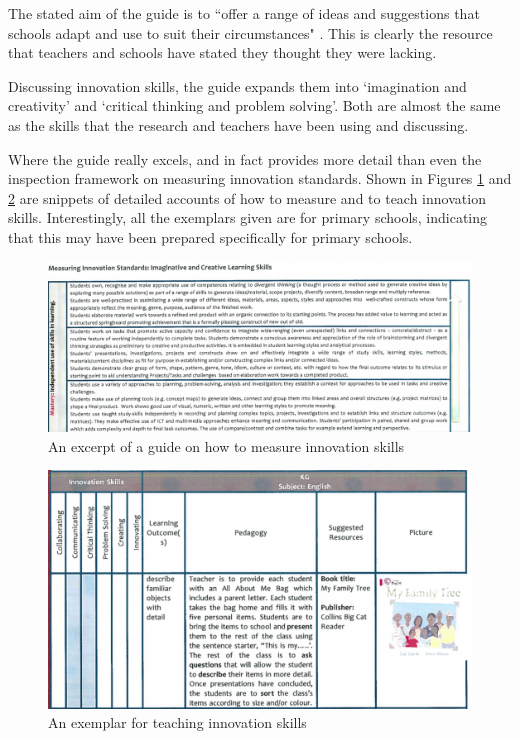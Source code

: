 \documentclass[11pt]{article}
\begin{document}
The stated aim of the guide is to ``offer a range of ideas and suggestions that schools adapt and use to suit their circumstances" \cite[p. 3]{ADEC2015a}. This is clearly the resource that teachers and schools  have stated they thought they were lacking.

Discussing innovation skills, the guide expands them into `imagination and creativity' and `critical thinking and problem solving'. Both are almost the same as the skills that the research and teachers have been using and discussing.

Where the guide really excels, and in fact provides more detail than even the inspection framework on measuring innovation standards. Shown in Figures \ref{fig:measuring-innovation} and \ref{fig:innovation-examplar} are snippets of detailed accounts of how to measure and to teach innovation skills. Interestingly, all the exemplars given are for primary schools, indicating that this may have been prepared specifically for primary schools.

\begin{figure}[h]
	\centering
	\captionsetup{justification=centering}
	\includegraphics[scale=0.5]{figures/measuring-innovation}
	\caption{An excerpt of a guide on how to measure innovation skills  \citep[p. 19]{ADEC2015a}}
	\label{fig:measuring-innovation} 
\end{figure}

\begin{figure}[h]
	\centering
	\captionsetup{justification=centering}
	\includegraphics[scale=0.6]{figures/innovation-examplar}
	\caption{An exemplar for teaching innovation skills  \citep[p. 25]{ADEC2015a}}
	\label{fig:innovation-examplar} 
\end{figure}
\end{document}
